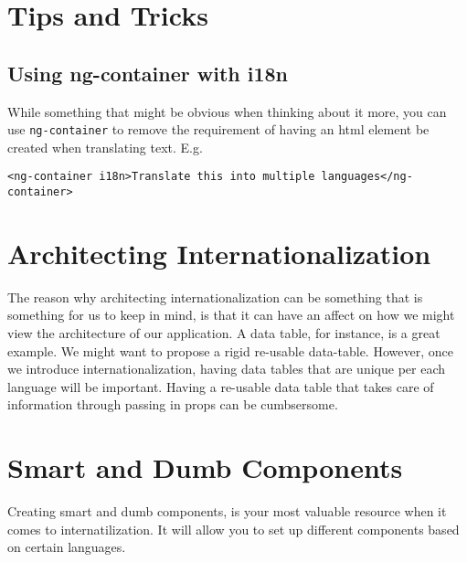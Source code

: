 
\section{Tips and Tricks}

\subsection{Using ng-container with i18n}
While something that might be obvious when thinking about it more, you can use 
\lstinline{ng-container} to remove the requirement of having an html element 
be created when translating text. E.g. 
\begin{lstlisting}
<ng-container i18n>Translate this into multiple languages</ng-container>
\end{lstlisting}

\section{ Architecting Internationalization }
The reason why architecting internationalization can be something that is
something for us to keep in mind, is that it can have an affect on how we might
view the architecture of our application. A data table, for instance, is a great
example. We might want to propose a rigid re-usable data-table. However, once
we introduce internationalization, having data tables that are unique per each
language will be important. Having a re-usable data table that takes care of
information through passing in props can be cumbsersome.

\section{ Smart and Dumb Components }
Creating smart and dumb components, is your most valuable resource when it comes
to internatilization. It will allow you to set up different components based on
certain languages. 
